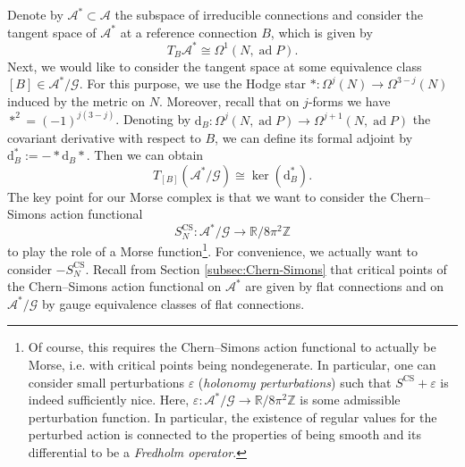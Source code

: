 \documentclass[11pt,colorinlistoftodos]{amsart}
\numberwithin{equation}{subsection}
\theoremstyle{plain}
\theoremstyle{definition}
\theoremstyle{remark}
\newcommand{\R}{\mathbb{R}}
\newcommand{\Z}{\mathbb{Z}}
\newcommand{\dd}{{\mathrm{d}}}
\DeclareMathOperator{\ad}{ad}
\newcommand{\calA}{\mathcal{A}}
\newcommand{\calG}{\mathcal{G}}
\begin{document}
Denote by $\mathcal{A}^*\subset \mathcal{A}$ the subspace of irreducible connections and consider the tangent space of $\calA^*$ at a reference connection $B$, which is given by 
\begin{equation}
    T_{B}\mathcal{A}^*\cong\Omega^1(N,\ad P).
\end{equation}
Next, we would like to consider the tangent space at some equivalence class $[B]\in \mathcal{A}^*/\mathcal{G}$. For this purpose, we use the Hodge star $*\colon \Omega^j(N)\to \Omega^{3-j}(N)$ induced by the metric on $N$. Moreover, recall that on $j$-forms we have $*^2=(-1)^{j(3-j)}$. Denoting by $\dd_B\colon \Omega^j(N,\ad P)\to \Omega^{j+1}(N,\ad P)$ the covariant derivative with respect to $B$, we can define its formal adjoint by $\dd^*_B:=-*\dd_{B}*$. Then we can obtain
\begin{equation}
    T_{[B]}(\mathcal{A}^*/\mathcal{G})\cong \ker(\dd_B^*).
\end{equation}
The key point for our Morse complex is that we want to consider the Chern--Simons action functional
\[
S^\mathrm{CS}_{N}\colon \mathcal{A}^*/\mathcal{G}\to \R/8\pi^2\Z
\]
to play the role of a Morse function\footnote{Of course, this requires the Chern--Simons action functional to actually be Morse, i.e. with critical points being nondegenerate. In particular, one can consider small perturbations $\varepsilon$ (\emph{holonomy perturbations}) such that $S^\mathrm{CS}+\varepsilon$ is indeed sufficiently nice. Here, $\varepsilon\colon \calA^*/\calG\to \R/8\pi^2\Z$ is some admissible perturbation function. 
In particular, the existence of regular values for the perturbed action is connected to the properties of being smooth and its differential to be a \emph{Fredholm operator}.}. For convenience, we actually want to consider $-S^\mathrm{CS}_{N}$.
Recall from Section \ref{subsec:Chern-Simons} that critical points of the Chern--Simons action functional on $\mathcal{A}^*$ are given by flat connections and on $\mathcal{A}^*/\mathcal{G}$ by gauge equivalence classes of flat connections. 
\end{document}
